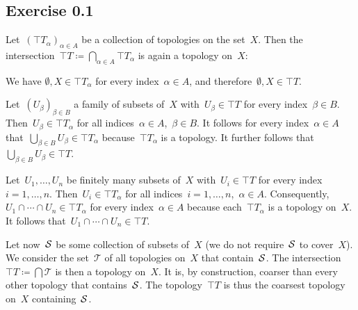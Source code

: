\subsection{Exercise 0.1}

Let~$(\top{T}_α)_{α ∈ A}$ be a collection of topologies on the set~$X$.
Then the intersection~$\top{T} ≔ ⋂_{α ∈ A} \top{T}_α$ is again a topology on~$X$:
\begin{itemize*}

	\item
		We have $∅, X ∈ \top{T}_α$ for every index~$α ∈ A$, and therefore~$∅, X ∈ \top{T}$.

	\item
		Let~$(U_β)_{β ∈ B}$ a family of subsets of~$X$ with~$U_β ∈ \top{T}$ for every index~$β ∈ B$.
		Then~$U_β ∈ \top{T}_α$ for all indices~$α ∈ A$,~$β ∈ B$.
		It follows for every index~$α ∈ A$ that~$⋃_{β ∈ B} U_β ∈ \top{T}_α$ because~$\top{T}_α$ is a topology.
		It further follows that~$⋃_{β ∈ B} U_β ∈ \top{T}$.

	\item
		Let~$U_1, \dotsc, U_n$ be finitely many subsets of~$X$ with~$U_i ∈ \top{T}$ for every index~$i = 1, \dotsc, n$.
		Then~$U_i ∈ \top{T}_α$ for all indices~$i = 1, \dotsc, n$,~$α ∈ A$.
		Consequently,~$U_1 ∩ \dotsb ∩ U_n ∈ \top{T}_α$ for every index~$α ∈ A$ because each~$\top{T}_α$ is a topology on~$X$.
		It follows that~$U_1 ∩ \dotsb ∩ U_n ∈ \top{T}$.

\end{itemize*}

Let now~$\mathcal{S}$ be some collection of subsets of~$X$ (we do not require~$\mathcal{S}$ to cover~$X$).
We consider the set~$\mathscr{T}$ of all topologies on~$X$ that contain~$\mathcal{S}$.
The intersection~$\top{T} ≔ ⋂ \mathscr{T}$ is then a topology on~$X$.
It is, by construction, coarser than every other topology that contains~$\mathcal{S}$.
The topology~$\top{T}$ is thus the coarsest topology on~$X$ containing~$\mathcal{S}$.

